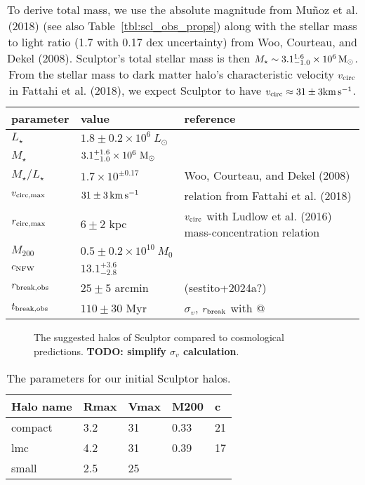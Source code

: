 \begin{table*}[t]
\centering
\caption[Derived Properties of Sculptor]{To derive total mass, we use the absolute magnitude from Muñoz et al. (2018) (see also Table \ref{tbl:scl_obs_props}) along with the stellar mass to light ratio (1.7 with 0.17 dex uncertainty) from Woo, Courteau, and Dekel (2008). Sculptor’s total stellar mass is then $M_\star \sim 3.1_{-1.0}^{1.6} \times 10^6\,{\rm M}_{\odot}$. From the stellar mass to dark matter halo’s characteristic velocity $v_{\rm circ}$ in Fattahi et al. (2018), we expect Sculptor to have $v_{\rm circ} \approx 31 \pm 3 {\rm km\,s^{-1}}$. }
\label{tbl:scl_derived_props}
\begin{tabular}{lll}
\toprule
parameter & value & reference\\
\midrule
$L_\star$ & $1.8\pm0.2\times10^6\ L_\odot$ & \\
$M_\star$ & $3.1_{-1.0}^{+1.6} \times10^6\ {\rm M}_\odot$ & \\
$M_\star / L_\star$ & $1.7\times 10^{\pm 0.17}$ & Woo, Courteau, and Dekel (2008)\\
$v_{\rm circ, max}$ & $31\pm 3\,{\rm km\,s^{-1}}$ & relation from Fattahi et al. (2018)\\
$r_{\rm circ, max}$ & $6 \pm 2$ kpc & $v_{\rm circ}$ with Ludlow et al. (2016) mass-concentration relation\\
$M_{200}$ & $0.5 \pm 0.2\times10^{10}\ M_0$ & \\
$c_{\rm NFW}$ & $13.1_{-2.8}^{+3.6}$ & \\
$r_{\rm break, obs}$ & $25 \pm 5$ arcmin & (sestito+2024a?)\\
$t_{\rm break, obs}$ & $110\pm30$ Myr & $\sigma_v$, $r_{\rm break}$ with @\\
\bottomrule
\end{tabular}
\end{table*}

\begin{figure}
\centering
{}
\caption[Sculptor initial halos]{The suggested halos of Sculptor
compared to cosmological predictions. \textbf{TODO: simplify
\(\sigma_v\) calculation}.}\label{fig:scl_halos}
\end{figure}

\begin{table*}[t]
\centering
\caption[Initial halos of Sculptor]{The parameters for our initial Sculptor halos. }
\label{tbl:scl_ini_halos}
\begin{tabular}{lllll}
\toprule
Halo name & Rmax & Vmax & M200 & c\\
\midrule
compact & 3.2 & 31 & 0.33 & 21\\
lmc & 4.2 & 31 & 0.39 & 17\\
small & 2.5 & 25 &  & \\
\bottomrule
\end{tabular}
\end{table*}

